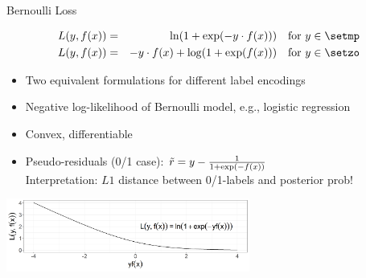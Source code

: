\begin{vbframe}{Bernoulli Loss}

\vspace*{-0.5cm}
\begin{eqnarray*}
  L(y, \fx) &=& \ln(1+\exp(-y \cdot \fx)) \quad \text{for } y \in \setmp\\
  L(y, \fx) &=& - y \cdot \fx + \log(1 + \exp(\fx)) \quad \text{for } y \in \setzo 
\end{eqnarray*}

\begin{itemize}
  \item Two equivalent formulations for different label encodings
  \item Negative log-likelihood of Bernoulli model, e.g., logistic regression
  \item Convex, differentiable
  \item Pseudo-residuals (0/1 case): $\tilde{r} = y - \frac{1}{1+\exp(-f(x))}$\\   
    Interpretation: $L1$ distance between 0/1-labels and posterior prob!
\end{itemize}

\vspace{0.2cm}
\begin{center}
\includegraphics[width = 8cm ]{figure/plot_bernoulli_plusmin_encoding.png}
\end{center}

\end{vbframe}





